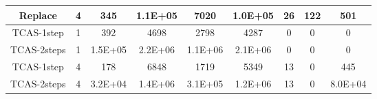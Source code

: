 \begin{table*}[]
\begin{tabular}{@{}ccccccccc@{}}
        Replace                                                     & 4                                                            & 345                                                        & 1.1E+05                                                     & 7020                                                           & 1.0E+05                                                        & 26                                                         & 122                                                           & 501      \\ \midrule \midrule
        TCAS-1step                                                  & 1                                                            & 392                                                        & 4698                                                        & 2798                                                           & 4287                                                           & 0                                                          & 0                                                             & 0        \\ \midrule
        TCAS-2steps                                                 & 1                                                            & 1.5E+05                                                    & 2.2E+06                                                     & 1.1E+06                                                        & 2.1E+06                                                        & 0                                                          & 0                                                             & 0        \\ \midrule
        TCAS-1step                                                  & 4                                                            & 178                                                        & 6848                                                        & 1719                                                           & 5349                                                           & 13                                                         & 0                                                             & 445      \\ \midrule
        TCAS-2steps                                                 & 4                                                            & 3.2E+04                                                    & 1.4E+06                                                     & 3.1E+05                                                        & 1.2E+06                                                        & 13                                                         & 0                                                             & 8.0E+04  \\ \midrule

\end{tabular}
\end{table*}
